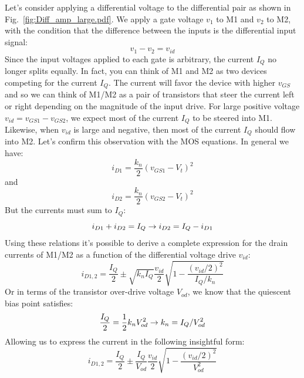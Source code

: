 Let's consider applying a differential voltage to the differential pair as shown in Fig.~\ref{fig:Diff_amp_large.pdf}.  We apply a gate voltage $v_1$ to M1 and $v_2$ to M2, with the condition that the difference between the inputs is the differential input signal:
\begin{equation}
	v_1 - v_2 = v_{id}
\end{equation}
Since the input voltages applied to each gate is arbitrary, the current $I_Q$ no longer splits equally.  In fact, you can think of M1 and M2 as two devices competing for the current $I_Q$.  The current will favor the device with higher $v_{GS}$ and so we can think of M1/M2 as a pair of transistors that steer the current left or right depending on the magnitude of the input drive.  For large positive voltage $v_{id} = v_{GS1} - v_{GS2}$, we expect most of the current $I_Q$ to be steered into M1.  Likewise, when $v_{id}$ is large and negative, then most of the current $I_Q$ should flow into M2.  Let's confirm this observation with the MOS equations.  In general we have:
\begin{equation}
	{i_{D1}} = \frac{{{k_n}}}{2}{\left( {{v_{GS1}} - {V_t}} \right)^2}
\end{equation}
and
\begin{equation} 
	{i_{D2}} = \frac{{{k_n}}}{2}{\left( {{v_{GS2}} - {V_t}} \right)^2}
\end{equation}
But the currents must sum to $I_Q$:
\begin{equation}
	{i_{D1}} + {i_{D2}} = I_Q \rightarrow
		{\rm{ }}{i_{D2}} = I_Q - {i_{D1}}
\end{equation}
Using these relations it's possible to derive a complete expression for the drain currents of M1/M2 as a function of the differential voltage drive $v_{id}$:
\begin{equation}
	{i_{D1,2}} = \frac{I_Q}{2} \pm \sqrt {{k_n}I_Q} \frac{{{v_{id}}}}{2}\sqrt {1 - \frac{{{{({v_{id}}/2)}^2}}}{{I_Q/{k_n}}}} 
\end{equation}
Or in terms of the transistor over-drive voltage $V_{od}$, we know that the quiescent bias point satisfies:
\begin{equation}
	\frac{I_Q}{2} = \frac{1}{2}{k_n}V_{od}^2{\rm{ }} \rightarrow {k_n} = I_Q/V_{od}^2 
\end{equation}
Allowing us to express the current in the following insightful form:
\begin{equation} 
	{i_{D1,2}} = \frac{I_Q}{2} \pm \frac{I_Q}{{{V_{od}}}}\frac{{{v_{id}}}}{2}\sqrt {1 - \frac{{{{({v_{id}}/2)}^2}}}{{V_{od}^2}}} 
	\label{eq:diff_large}
\end{equation}
